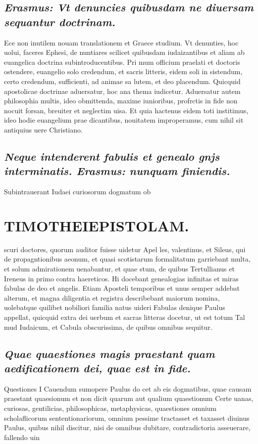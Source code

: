 \documentclass{article}
\begin{document}
\begin{pages}
\subsection*{\textit{Erasmus: Vt denuncies quibusdam ne diuersam sequantur doctrinam. }}\pstart Ece non inutilem nouam translationem et Graece studium. Vt denunties, hoc uolui, faceres Ephesi, de nuntiares scilicet quibusdam iudaizantibus et aliam ab euangelica doctrina subintroducentibus. Pri mum officium praelati et doctoris ostendere, euangelio solo credendum, et sacris litteris, eidem soli in sistendum, certo credendum, sufficienti, ad animae sa lutem, et deo placendum.  \pend\pstart Quicquid apostolicae doctrinae aduersatur, hoc ana thema iudicetur. Aduersatur autem philosophia multis, ideo obmittenda, maxime iunioribus, profrctis in fide non nocuit forsan, breuiter et neglectim uisa. Et quia hactenus eidem toti institimus, ideo hodie euangelium prae dicantibus, nouitatem improperamus, cum nihil sit antiquius uere Christiano.  \pend
{}
{}
\subsection*{\textit{Neque intenderent fabulis et genealo gnjs interminatis. Erasmus: nunquam finiendis. }}\pstart Subintrauerant Iudaei curiosorum dogmatum ob  \pend
\section*{TIMOTHEIEPISTOLAM. }
\marginpar{[ p.13 ]}\pstart scuri doctores, quorum auditor fuisse uidetur Apel les, valentinus, et Sileus, qui de propagntionibus aeonum, et quasi scotistarum formalitatum garriebant multa, et solum admirationem uenabantur, et quae stum, de quibus Tertullianus et Ireneus in primo contra haereticos. Hi docebant genealogias infinitas et miras fabulas de deo et angelis. Etiam Aposteli temporibus et unus semper addebat alterum, et magna diligentia et registra describebant maiorum nomina, uolebatque quilibet nobiliori familia natus uideri  \pend\pstart Fabulas denique Paulus appellat, quicquid extra dei uerbum et sacras litteras docetur, ut est totum Tal mud Iudaicum, et Cabula obscurissima, de quibus omnibus sequitur.  \pend
{}
{}
\subsection*{\textit{Quae quaestiones magis praestant quam aedificationem dei, quae est in fide. }}\pstart Questiones I Cauendum sumopere Paulus do cet ab eis dogmatibus, quae causam praestant quaesionum et non dicit quarum aut qualium quaestionum Certe uanas, curiosas, gentilicias, philosophicas, metaphysicas, quaestiones omnium scholaflicorum sententionariorum, omnium pessime tractasset et taxasset diuinus Paulus, quibus nihil discitur, nisi de omnibus dubitare, contradictoria asseuerare, fallendo uin  \pend

\end{pages}
\end{document}
